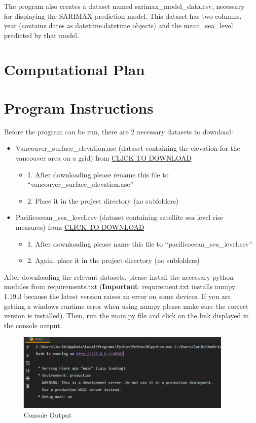 \documentclass[fontsize=11pt]{article}
\begin{document}
The program also creates a dataset named sarimax\_model\_data.csv, necessary for displaying the SARIMAX prediction model. This dataset has two columns, year (contains dates as datetime.datetime objects) and the mean\_sea\_level predicted by that model. 


\section*{Computational Plan}
\hspace{\parindent}

 
\section*{Program Instructions}
Before the program can be run, there are 2 necessary datasets to download:
\begin{itemize}
    \item Vancouver\_surface\_elevation.asc (dataset containing the elevation for the vancouver area on a grid) from
    \href{https://drive.google.com/file/d/1pCJPV3rH0k5obd4s5SHKsn5q8E2FqlKg/view?usp=sharing}{CLICK TO DOWNLOAD} 
    \begin{itemize}
        \item 1. After downloading please rename this file to “vancouver\_surface\_elevation.asc”
        \item 2. Place it in the project directory (no subfolders)
    \end{itemize}
    \item Pacificocean\_sea\_level.csv (dataset containing satellite sea level rise measures) from
    \href{https://www.star.nesdis.noaa.gov/socd/lsa/SeaLevelRise/slr/slr_sla_np_keep_txj1j2.csv}{CLICK TO DOWNLOAD}
    \begin{itemize}
        \item 1. After downloading please name this file to “pacificocean\_sea\_level.csv”
        \item 2. Again, place it in the project directory (no subfolders)
    \end{itemize}
\end{itemize}

After downloading the relevant datasets, please install the necessary python modules from requirements.txt (\textbf{Important}: requirement.txt installs numpy 1.19.3 because the latest version raises an error on some devices. If you are getting a windows runtime error when using numpy please make sure the correct version is installed).
Then, run the main.py file and click on the link displayed in the console output. \\
\begin{figure}[h]
\centering 
\includegraphics[width=300pt]{console.png}
\caption{Console Output}
\end{figure} 
\end{document}
